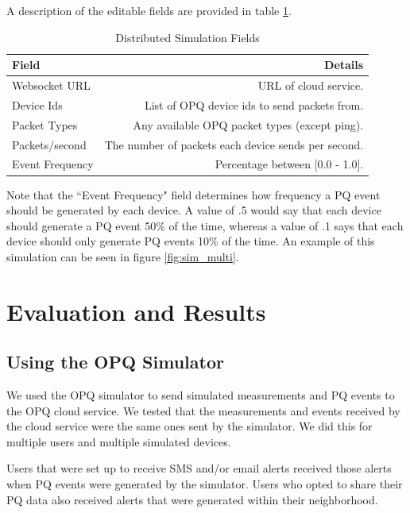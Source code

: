 \documentclass[11pt]{article}
\begin{document}
A description of the editable fields are provided in table \ref{tab:dist_sim}.

\begin{table}[htbp]
	\caption{Distributed Simulation Fields}
	\label{tab:dist_sim}
	\begin{center}
		\begin{tabular}{|l|r|}
			\hline
			\textbf{Field} & \textbf{Details}\\
			\hline
			Websocket URL & URL of cloud service.\\
			\hline
			Device Ids & List of OPQ device ids to send packets from.\\
			\hline
			Packet Types & Any available OPQ packet types (except ping).\\
			\hline
			Packets/second & The number of packets each device sends per second.\\
			\hline
			Event Frequency & Percentage between [0.0 - 1.0].\\
			\hline
		\end{tabular}
	\end{center}
\end{table} 

Note that the ``Event Frequency" field determines how frequency a PQ event should be generated by each device. A value of .5 would say that each device should generate a PQ event 50\% of the time, whereas a value of .1 says that each device should only generate PQ events 10\% of the time. An example of this simulation can be seen in figure \ref{fig:sim_multi}.

\section{Evaluation and Results}
\subsection{Using the OPQ Simulator}
We used the OPQ simulator to send simulated measurements and PQ events to the OPQ cloud service. We tested that the measurements and events received by the cloud service were the same ones sent by the simulator. We did this for multiple users and multiple simulated devices.

Users that were set up to receive SMS and/or email alerts received those alerts when PQ events were generated by the simulator. Users who opted to share their PQ data also received alerts that were generated within their neighborhood. 
\end{document}

